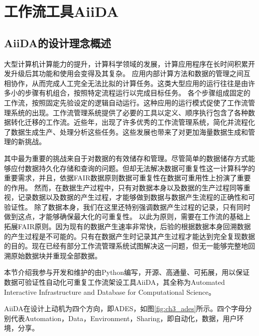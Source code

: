 \section{工作流工具AiiDA}

\subsection{AiiDA的设计理念概述}

大型计算机计算能力的提升，计算科学领域的发展，计算应用程序在长时间积累开发升级后其功能和使用会变得及其复杂。
应用内部计算方法和数据的管理之间互相协作，从而完成人工完全无法比拟的计算任务。这类大型应用的运行往往是由许多小的步骤有机组合，按照特定流程运行以完成目标任务。
各个步骤组成固定的工作流，按照固定先验设定的逻辑自动运行。这种应用的运行模式促使了工作流管理系统的出现。工作流管理系统提供了必要的工具以定义、顺序执行包含了各种数据转化迁移的工作流。近些年，出现了许多优秀的工作流管理系统，简化并流程化了数据生成生产、处理分析这些任务。这些发展也带来了对更加海量数据生成和管理的新挑战。

其中最为重要的挑战来自于对数据的有效储存和管理。尽管简单的数据储存方式能够应付数据持久化存储和查询的问题。但却无法解决数据可重复性这一计算科学的重要需求，并且，依据FAIR数据原则\cite{wilkinson2016fair}数据可重复性在数据可重用性上扮演了重要的作用。
然而，在数据生产过程中，只有对数据本身以及数据的生产过程同等重视，记录数据以及数据的产生过程，才能够做到数据与数据产生流程的正确性和可验证性\cite{ioannidis2009repeatability, peng2011reproducible, stoddart2016there, allison2016reproducibility}。
除了数据本身，我们在这里还特别强调数据产生过程的记录，只有同时做到这点，才能够确保最大化的可重复性。
以此为原则，需要在工作流的基础上拓展FAIR原则。因为现有的数据产生速率非常快，后验的根据数据本身回溯数据的产生过程是不可能的。只有在数据产生时记录其产生过程才能达到完全复现数据的目的。现在已经有部分工作流管理系统试图解决这一问题，但无一能够完整地回溯原始数据块并重现全部数据。

本节介绍我参与开发和维护的由Python编写，开源、高通量、可拓展，用以保证数据可验证性自动化可重复工作流架设工具AiiDA\cite{pizzi2016aiida,huber2020aiida}，其全称为Automated Interactive Infrastructure and Database for Computational Science。

AiiDA在设计上动机为四个方向，即ADES，如图\ref{fig:ch3_ades}所示。四个字母分别代表Automation，Data，Environment，Sharing，即自动化，数据，用户环境，分享。

